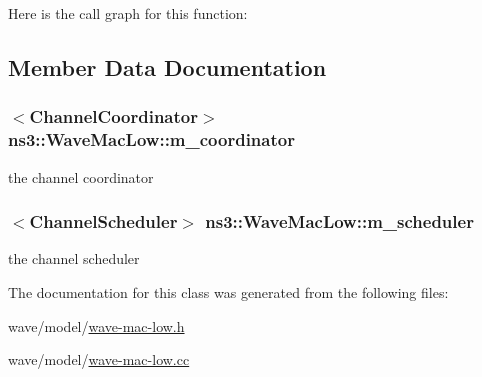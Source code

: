Here is the call graph for this function\+:




\subsection{Member Data Documentation}
\subsubsection[{\texorpdfstring{m\+\_\+coordinator}{m_coordinator}}]{$<${\bf Channel\+Coordinator}$>$ ns3\+::\+Wave\+Mac\+Low\+::m\+\_\+coordinator\hspace{0.3cm}{\ttfamily [private]}}\hypertarget{classns3_1_1WaveMacLow_a4f562192ac6c5f24ea09027d4a61dc47}{}\label{classns3_1_1WaveMacLow_a4f562192ac6c5f24ea09027d4a61dc47}


the channel coordinator 

\subsubsection[{\texorpdfstring{m\+\_\+scheduler}{m_scheduler}}]{$<${\bf Channel\+Scheduler}$>$ ns3\+::\+Wave\+Mac\+Low\+::m\+\_\+scheduler\hspace{0.3cm}{\ttfamily [private]}}\hypertarget{classns3_1_1WaveMacLow_a81d1eed416dfe85b7e79be811a8889f8}{}\label{classns3_1_1WaveMacLow_a81d1eed416dfe85b7e79be811a8889f8}


the channel scheduler 



The documentation for this class was generated from the following files\+:\begin{DoxyCompactItemize}
\item 
wave/model/\hyperlink{wave-mac-low_8h}{wave-\/mac-\/low.\+h}\item 
wave/model/\hyperlink{wave-mac-low_8cc}{wave-\/mac-\/low.\+cc}\end{DoxyCompactItemize}

